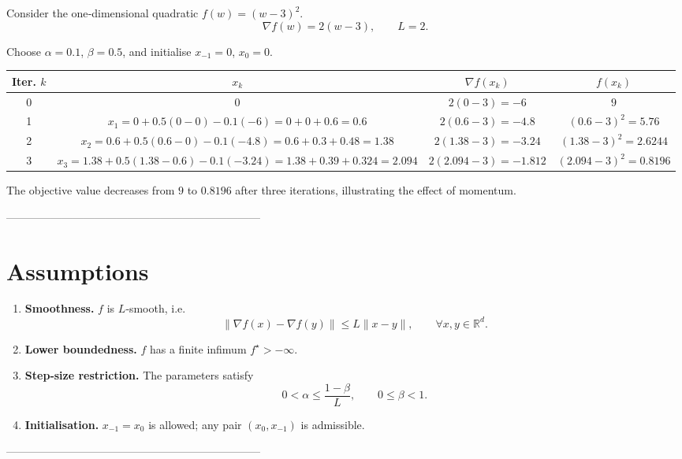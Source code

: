 \documentclass{article}
\begin{document}
Consider the one‑dimensional quadratic $f(w)=(w-3)^{2}$.
\[
\nabla f(w)=2(w-3),\qquad L=2.
\]

Choose $\alpha=0.1$, $\beta=0.5$, and initialise $x_{-1}=0$, $x_{0}=0$.

\begin{center}
\begin{tabular}{c|c|c|c}
\textbf{Iter.} $k$ & $x_{k}$ & $\nabla f(x_{k})$ & $f(x_{k})$ \\ \hline
0 & $0$ & $2(0-3)=-6$ & $9$ \\[2mm]
1 & $x_{1}=0+0.5(0-0)-0.1(-6)=0+0+0.6=0.6$ &
$2(0.6-3)=-4.8$ & $(0.6-3)^{2}=5.76$ \\[2mm]
2 & $x_{2}=0.6+0.5(0.6-0)-0.1(-4.8)=0.6+0.3+0.48=1.38$ &
$2(1.38-3)=-3.24$ & $(1.38-3)^{2}=2.6244$ \\[2mm]
3 & $x_{3}=1.38+0.5(1.38-0.6)-0.1(-3.24)=1.38+0.39+0.324=2.094$ &
$2(2.094-3)=-1.812$ & $(2.094-3)^{2}=0.8196$
\end{tabular}
\end{center}

The objective value decreases from $9$ to $0.8196$ after three iterations, illustrating the effect of momentum.

---------------------------------------------------------------------

\section*{Assumptions}

\begin{enumerate}[label={\bf A\arabic*}.]
\item \textbf{Smoothness.} $f$ is $L$‑smooth, i.e.
\[
\|\nabla f(x)-\nabla f(y)\|\le L\|x-y\|,\qquad\forall x,y\in\mathbb{R}^{d}.
\tag{A1}
\]

\item \textbf{Lower boundedness.} $f$ has a finite infimum $f^{\star}>-\infty$.

\item \textbf{Step‑size restriction.} The parameters satisfy
\[
0<\alpha\le\frac{1-\beta}{L},\qquad 0\le\beta<1.
\tag{A3}
\]

\item \textbf{Initialisation.} $x_{-1}=x_{0}$ is allowed; any pair $(x_{0},x_{-1})$ is admissible.
\end{enumerate}

---------------------------------------------------------------------
\end{document}
